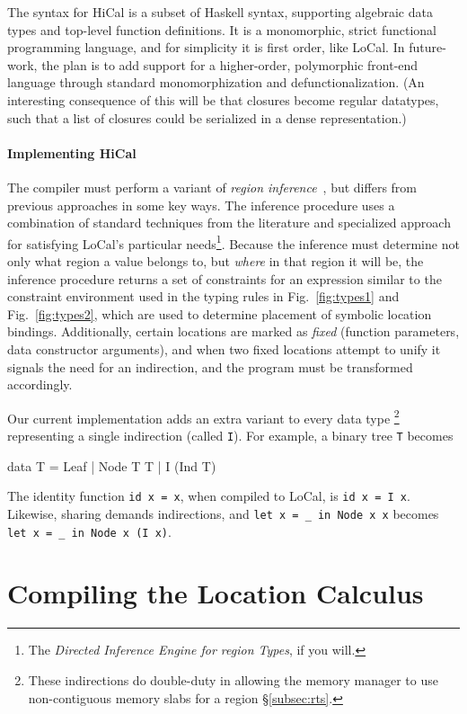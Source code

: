 \documentclass[showabstract,showacknowledgments,showpreface,showdedication,school]{iuphd}
\theoremstyle{nonumberplain}
\newcommand{\sysname}[0]{LoCal\xspace}
\newcommand{\ourcalc}[0]{\sysname}
\newcommand{\lamadt} [0]{HiCal\xspace}
\newcommand{\secref}[1]{\S\ref{#1}}
\newcommand{\figref}[1]{Fig.~\ref{#1}}
\newcommand{\il}[1]{\lstinline[style=inline,mathescape=true];#1;}
\begin{document}
{The syntax for \lamadt is a subset of Haskell syntax, supporting
  algebraic data types and top-level function definitions. It is a
  monomorphic, strict functional programming language, and for
  simplicity it is first order, like \ourcalc.}
{In future-work, the plan is to add support for a higher-order, polymorphic
  front-end language through standard monomorphization and defunctionalization.
  (An interesting consequence of this will be that closures become regular
  datatypes, such that a list of closures could be serialized in a dense
  representation.)}


\paragraph{Implementing \lamadt}
The compiler must perform a variant of {\em region
  inference}~\cite{regioncalcs,mlkit-retrospective}, but differs from
previous approaches in some key ways.
The inference procedure uses a combination of standard techniques from the literature and specialized
approach for satisfying \ourcalc's particular needs\footnote{The {\em
    Directed Inference Engine for region Types}, if you will.}.
Because the inference must determine not only what region a value belongs to,
but \emph{where} in that region it will be, the inference procedure returns a
set of constraints for an expression similar to the constraint environment used
in the typing rules in \figref{fig:types1} and \figref{fig:types2}, which are
used to determine placement of symbolic location bindings. Additionally, certain
locations are marked as \emph{fixed} (function parameters, data constructor
arguments), and when two fixed locations attempt to unify it signals the need
for an indirection, and the program must be transformed accordingly.

Our current implementation adds an extra variant to every data type
\footnote{These indirections do double-duty in allowing the memory
  manager to use non-contiguous memory slabs for a region \secref{subsec:rts}.}
representing a single indirection (called \il{I}).  For example, a binary tree
\il{T} becomes
\begin{code}
data T = Leaf | Node T T | I (Ind T)
\end{code}
The identity function \il{id x = x}, when compiled to \ourcalc, is \il{id x = I x}.
Likewise, sharing demands indirections, and
\il{let x = _ in Node x x}
becomes
\il{let x = _ in Node x (I x)}.



\section{Compiling the Location Calculus} \label{sec:impl-local}
\end{document}
